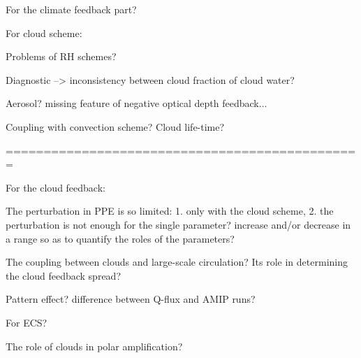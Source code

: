 For the climate feedback part?

For cloud scheme:

Problems of RH schemes?

Diagnostic --> inconsistency between cloud fraction of cloud water?

Aerosol? missing feature of negative optical depth feedback...

Coupling with convection scheme? Cloud life-time?

===============================================

For the cloud feedback:

The perturbation in PPE is so limited: 1. only with the cloud scheme, 2. the perturbation is not enough for the single parameter? increase and/or decrease in a range so as to quantify the roles of the parameters? 

The coupling between clouds and large-scale circulation? Its role in determining the cloud feedback spread?

Pattern effect? difference between Q-flux and AMIP runs?

For ECS?

The role of clouds in polar amplification?


